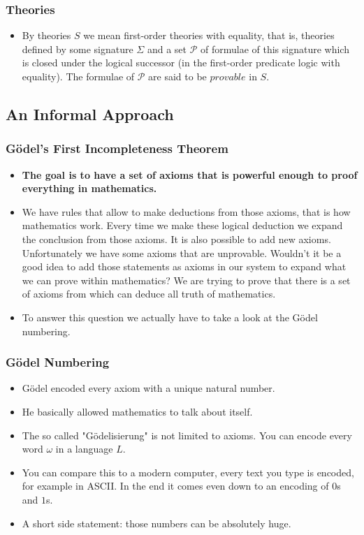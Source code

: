 \documentclass[aspectratio=169]{beamer}
\begin{document}
\begin{frame}
	\frametitle{Theories}
	\begin{itemize}
		\item By theories $S$ we mean first-order theories with equality, that is, theories defined by some signature $\Sigma$ and a set $\mathscr{P}$ of formulae of this signature which is closed under the logical successor (in the first-order predicate logic with equality). The formulae of $\mathscr{P}$ are said to be $provable$ in $S$.
	\end{itemize}
\begin{flushright}
	\cite{bekl}
\end{flushright}
\end{frame}

\begin{frame}
\subsection{An Informal Approach}
	\frametitle{Gödel's First Incompleteness Theorem}
	\begin{itemize}
		\item \textbf{The goal is to have a set of axioms that is powerful enough to proof everything in mathematics.}
		\item We have rules that allow to make deductions from those axioms, that is how mathematics work. Every time we make these logical deduction we expand the conclusion from those axioms. It is also possible to add new axioms. Unfortunately we have some axioms that are unprovable. Wouldn't it be a good idea to add those statements as axioms in our system to expand what we can prove within mathematics? We are trying to prove that there is a set of axioms from which can deduce all truth of mathematics. 
		\item To answer this question we actually have to take a look at the Gödel numbering.
	\end{itemize}
\end{frame}
\begin{frame}
	\frametitle{Gödel Numbering}
	\begin{itemize}
		\item Gödel encoded every axiom with a unique natural number.
		\item He basically allowed mathematics to talk about itself.
		\item The so called "Gödelisierung" is not limited to axioms. You can encode every word $\omega$ in a language $L$.
		\item You can compare this to a modern computer, every text you type is encoded, for example in ASCII. In the end it comes even down to an encoding of $0$s and $1$s.
		\item [] A short side statement: those numbers can be absolutely huge.
	\end{itemize}
\end{frame}
\end{document}
